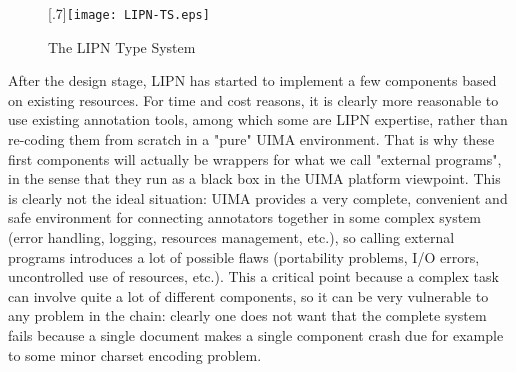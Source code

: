 \begin{figure}[htbp]
\begin{center}
\scalebox{.8}[.7]{\texttt{[image: LIPN-TS.eps]}}
\end{center}
\caption{The LIPN Type System \label{fig-LIPN-TS}}
\end{figure}


After the design stage, LIPN has started to implement a few components based on existing resources. For time and cost reasons, it is clearly more reasonable to use existing annotation tools, among which some are LIPN expertise, rather than re-coding them from scratch in a "pure" UIMA environment. That is why these first components will actually be wrappers for what we call "external programs", in the sense that they run as a black box in the UIMA platform viewpoint. This is clearly not the ideal situation: UIMA provides a very complete, convenient and safe environment for connecting annotators together in some complex system (error handling, logging, resources management, etc.), so calling external programs introduces a lot of possible flaws (portability problems, I/O errors, uncontrolled use of resources, etc.). This a critical point because a complex task can involve quite a lot of different components, so it can be very vulnerable to any problem in the chain: clearly one does not want that the complete system fails because a single document makes a single component crash due for example to some minor charset encoding problem. 

